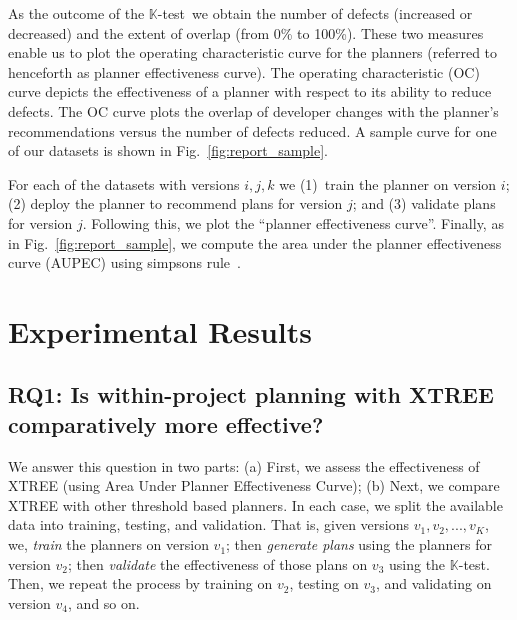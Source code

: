 \documentclass[smallextended]{svjour3}       %
\newcommand{\ktest}{$\mathbb{K}$-test}
\newcommand{\fig}[1]{Fig.~\ref{fig:#1}}
\begin{document}
As the outcome of the {\ktest}~we obtain the number of defects (increased or decreased) and the extent of overlap (from 0\% to 100\%). These two measures enable us to plot the operating characteristic curve for the planners (referred to henceforth as planner effectiveness curve). The operating characteristic (OC) curve depicts the effectiveness of a planner with respect to its ability to reduce defects. The OC curve plots the overlap of developer changes with the planner's recommendations versus the number of defects reduced. A sample curve for one of our datasets is shown in \fig{report_sample}.

For each of the datasets with versions $i, j, k$ we (1)~train the planner on version $i$; (2) deploy the planner to recommend plans for version $j$; and (3) validate plans for version $j$. Following this, we plot the ``planner effectiveness curve''. Finally, as in \fig{report_sample}, we compute the area under the planner effectiveness curve (AUPEC) using simpsons rule~\cite{Burden:1988}.




 




\section{Experimental Results}
\label{sect:results}
\subsection*{{\bf RQ1: Is within-project planning with XTREE comparatively
more effective?}}

We answer this question in two parts: (a) First, we assess the effectiveness of XTREE (using Area Under Planner Effectiveness Curve); (b) Next, we compare XTREE with other threshold based planners. In each case, we split the available data into training, testing, and validation. That is, given versions $v_1, v_2, ..., v_K$, we, 
{\em train} the planners on version $v_1$; then 
{\em generate plans} using the planners for version $v_2$;
then {\em validate} the effectiveness of those plans on $v_3$ using the \ktest.
Then,  we repeat the process by training on $v_2$, testing on $v_3$, and validating on version $v_4$, and so on.
\end{document}
